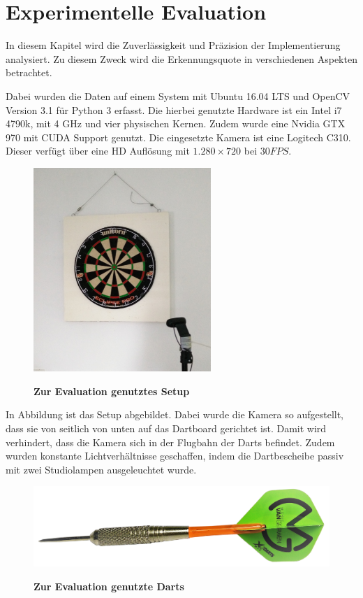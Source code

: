 
\chapter{Experimentelle Evaluation}
\label{chap:evaluation}
In diesem Kapitel wird die Zuverlässigkeit und Präzision der Implementierung analysiert. Zu diesem Zweck wird die Erkennungsquote in verschiedenen Aspekten betrachtet.

Dabei wurden die Daten auf einem System mit Ubuntu 16.04 LTS und OpenCV Version 3.1 für Python 3 erfasst. Die hierbei genutzte Hardware ist ein Intel i7 4790k, mit 4 GHz und vier physischen Kernen. Zudem wurde eine Nvidia GTX 970 mit CUDA Support genutzt.
Die eingesetzte Kamera ist eine Logitech C310. Dieser verfügt über eine HD Auflösung mit  $1.280\times720$ bei $30FPS$. 

\begin{figure}[ht]
\centering
\includegraphics[width=0.6\textwidth]{media/testsetup}\\
\caption{\textbf{Zur Evaluation genutztes Setup}}
\label{Fig:testsetup}
\end{figure}
In Abbildung  ist das Setup abgebildet. Dabei wurde die Kamera so aufgestellt, dass sie von seitlich von unten auf das Dartboard gerichtet ist. Damit wird verhindert, dass die Kamera sich in der Flugbahn der Darts befindet. Zudem wurden konstante Lichtverhältnisse geschaffen, indem die Dartbescheibe passiv mit zwei Studiolampen ausgeleuchtet wurde.
\begin{figure}[ht]
\centering
\includegraphics[width=\textwidth]{media/MyDart.png}\\
\caption{\textbf{Zur Evaluation genutzte Darts}}
\label{Fig:mydart}
\end{figure}

